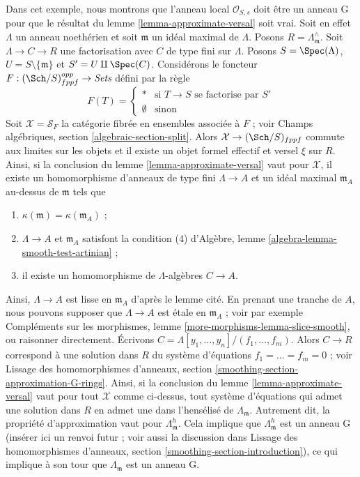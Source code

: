 \begin{example}
\label{example-approximate-versal-implies}
Dans cet exemple, nous montrons que l'anneau local $\mathcal{O}_{S, s}$ doit
être un anneau G pour que le résultat du lemme
\ref{lemma-approximate-versal} soit vrai. Soit en effet $\Lambda$ un anneau
noethérien et soit $\mathfrak m$ un idéal maximal de $\Lambda$. Posons
$R = \Lambda_\mathfrak m^\wedge$. Soit $\Lambda \to C \to R$ une
factorisation avec $C$ de type fini sur $\Lambda$. Posons
$S = \Spec(\Lambda)$, $U = S \setminus \{\mathfrak m\}$ et
$S' = U \amalg \Spec(C)$. Considérons le foncteur
$F : (\Sch/S)_{fppf}^{opp} \to \textit{Sets}$ défini par la règle
$$
F(T) = 
\left\{
\begin{matrix}
* & \text{si }T \to S\text{ se factorise par }S' \\
\emptyset & \text{sinon}
\end{matrix}
\right.
$$
Soit $\mathcal{X} = \mathcal{S}_F$ la catégorie fibrée en ensembles associée
à $F$ ; voir Champs algébriques, section \ref{algebraic-section-split}.
Alors $\mathcal{X} \to (\Sch/S)_{fppf}$ commute aux limites sur les objets et
il existe un objet formel effectif et versel $\xi$ sur $R$. Ainsi, si la
conclusion du lemme \ref{lemma-approximate-versal} vaut pour $\mathcal{X}$,
il existe un homomorphisme d'anneaux de type fini $\Lambda \to A$ et un idéal
maximal $\mathfrak m_A$ au-dessus de $\mathfrak m$ tels que
\begin{enumerate}
\item $\kappa(\mathfrak m) = \kappa(\mathfrak m_A)$ ;
\item $\Lambda \to A$ et $\mathfrak m_A$ satisfont la condition (4)
d'Algèbre, lemme \ref{algebra-lemma-smooth-test-artinian} ;
\item il existe un homomorphisme de $\Lambda$-algèbres $C \to A$.
\end{enumerate}
Ainsi, $\Lambda \to A$ est lisse en $\mathfrak m_A$ d'après le lemme cité.
En prenant une tranche de $A$, nous pouvons supposer que $\Lambda \to A$ est
étale en $\mathfrak m_A$ ; voir par exemple Compléments sur les morphismes,
lemme \ref{more-morphisms-lemma-slice-smooth}, ou raisonner directement.
Écrivons $C = \Lambda[y_1, \ldots, y_n]/(f_1, \ldots, f_m)$. Alors
$C \to R$ correspond à une solution dans $R$ du système d'équations
$f_1 = \ldots = f_m = 0$ ; voir Lissage des homomorphismes d'anneaux, section
\ref{smoothing-section-approximation-G-rings}. Ainsi, si la conclusion du
lemme \ref{lemma-approximate-versal} vaut pour tout $\mathcal{X}$ comme
ci-dessus, tout système d'équations qui admet une solution dans $R$ en admet
une dans l'hensélisé de $\Lambda_{\mathfrak m}$. Autrement dit, la propriété
d'approximation vaut pour $\Lambda_{\mathfrak m}^h$. Cela implique que
$\Lambda_{\mathfrak m}^h$ est un anneau G (insérer ici un renvoi futur ; voir
aussi la discussion dans Lissage des homomorphismes d'anneaux, section
\ref{smoothing-section-introduction}), ce qui implique à son tour que
$\Lambda_{\mathfrak m}$ est un anneau G.
\end{example}






